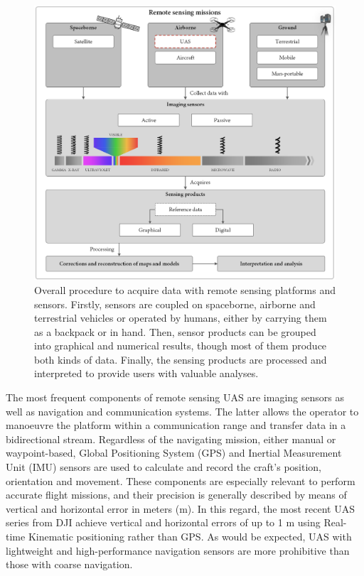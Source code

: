 \begin{figure}[!ht]
	\includegraphics{figs/introduction/introduction_scheme.png}
	\caption{Overall procedure to acquire data with remote sensing platforms and sensors. Firstly, sensors are coupled on spaceborne, airborne and terrestrial vehicles or operated by humans, either by carrying them as a backpack or in hand. Then, sensor products can be grouped into graphical and numerical results, though most of them produce both kinds of data. Finally, the sensing products are processed and interpreted to provide users with valuable analyses. }
    \label{fig:introduction_scheme}
\end{figure}

The most frequent components of remote sensing UAS are imaging sensors as well as navigation and communication systems. The latter allows the operator to manoeuvre the platform within a communication range and transfer data in a bidirectional stream. Regardless of the navigating mission, either manual or waypoint-based, Global Positioning System (GPS) and Inertial Measurement Unit (IMU) sensors are used to calculate and record the craft's position, orientation and movement. These components are especially relevant to perform accurate flight missions, and their precision is generally described by means of vertical and horizontal error in meters (\si{\meter}). In this regard, the most recent UAS series from DJI achieve vertical and horizontal errors of up to 1 \si{\meter} using Real-time Kinematic positioning rather than GPS. As would be expected, UAS with lightweight and high-performance navigation sensors are more prohibitive than those with coarse navigation.    


